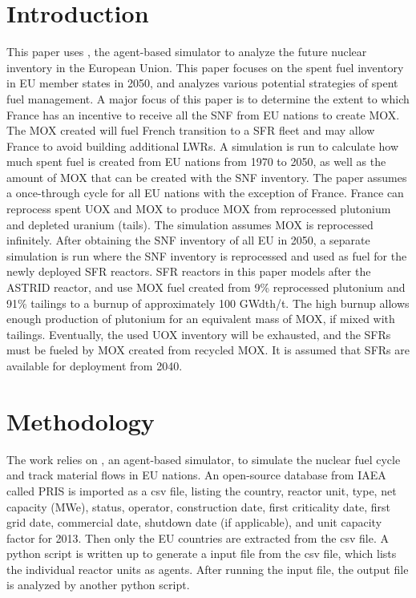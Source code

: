 \section{Introduction}
This paper uses \Cyclus, the agent-based simulator \cite{huff_fundamental_2016} to analyze
the future nuclear inventory in the European Union. This paper focuses on the spent fuel
inventory in \gls{EU} member states in 2050, and analyzes various potential strategies of spent fuel
management.
A major focus of this paper is to determine the extent to which France has an incentive
to receive all the \gls{SNF} from \gls{EU} nations to create \gls{MOX}.
The \gls{MOX} created will fuel French transition to a \gls{SFR} fleet
and may allow France to avoid building additional \glspl{LWR}.
A \Cyclus simulation is run to calculate
how much spent fuel is created from \gls{EU} nations from 1970 to 2050, as well as the amount
of \gls{MOX} that can be created with the \gls{SNF} inventory.
The paper assumes a once-through cycle for all 
\gls{EU} nations with the exception of France. France can reprocess spent \gls{UOX} and \gls{MOX} to
produce \gls{MOX} from reprocessed plutonium and depleted uranium (tails).
The simulation assumes \gls{MOX} is reprocessed infinitely. 
After obtaining the \gls{SNF} inventory of all \gls{EU} in 2050, a separate
simulation is run where the \gls{SNF} inventory is reprocessed and
used as fuel for the newly deployed \gls{SFR} reactors.
\gls{SFR} reactors in this paper models after the ASTRID reactor,
and use \gls{MOX} fuel created from 9\% reprocessed plutonium
and 91\% tailings to a burnup
of approximately 100 GWdth/t. The high burnup allows enough production of plutonium
for an equivalent mass of \gls{MOX}, if mixed with tailings.  Eventually,
the used \gls{UOX} inventory will be exhausted, and the \glspl{SFR} must be
fueled by \gls{MOX} created from recycled \gls{MOX}.
It is assumed that \glspl{SFR} are available for deployment
from 2040. 


\section{Methodology}
The work relies on \Cyclus, an agent-based simulator, to simulate the nuclear fuel cycle
and track material flows in \gls{EU} nations. An open-source database from \gls{IAEA} called
\gls{PRIS} is imported as a csv file, listing the country, reactor unit, type, net capacity (MWe), status,
operator, construction date, first criticality date, first grid date, commercial date, shutdown
date (if applicable), and unit capacity factor for 2013. Then only the \gls{EU} countries are extracted
from the csv file. A python script is written up to generate a \Cyclus input file from the csv file,
which lists the individual reactor units as agents. After running the \Cyclus input file,
the output file is analyzed by another python script.

